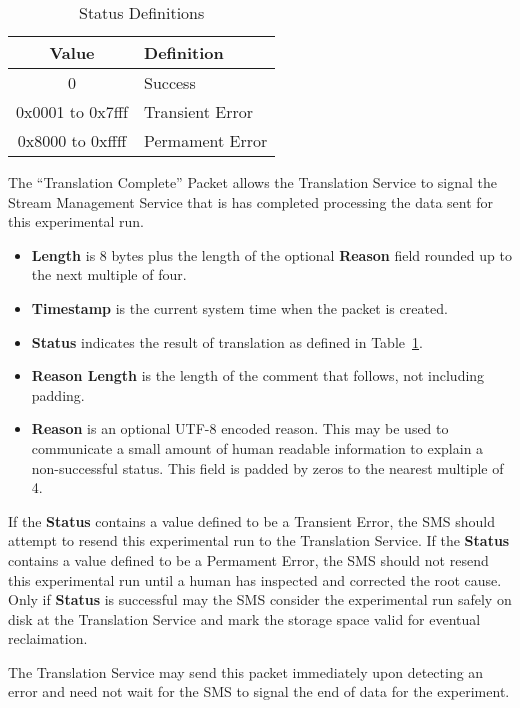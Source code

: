 \begin{table}[h]
  \begin{center}
    \begin{tabular}{c | l}
	Value & Definition \\
	\hline
	0 & Success \\
	0x0001 to 0x7fff & Transient Error \\
	0x8000 to 0xffff & Permament Error \\
    \end{tabular}
  \end{center}
  \caption {Status Definitions}
  \label{table:protocol_completion_status_values}
\end{table}

The ``Translation Complete'' Packet allows the Translation Service to signal
the Stream Management Service that is has completed processing the data sent
for this experimental run.

\begin{itemize}
\item{\bf Length} is 8 bytes plus the length of the optional {\bf Reason} field
rounded up to the next multiple of four.
\item{\bf Timestamp} is the current system time when the packet is created.
\item{\bf Status} indicates the result of translation as defined in
Table~\ref{table:protocol_completion_status_values}.
\item{\bf Reason Length} is the length of the comment that follows, not
including padding.
\item{\bf Reason} is an optional UTF-8 encoded reason. This may be used
to communicate a small amount of human readable information to explain
a non-successful status. This field is padded by zeros to the nearest
multiple of 4.
\end{itemize}

If the {\bf Status} contains a value defined to be a Transient Error, the SMS
should attempt to resend this experimental run to the Translation Service.  If
the {\bf Status} contains a value defined to be a Permament Error, the SMS
should not resend this experimental run until a human has inspected and
corrected the root cause. Only if {\bf Status} is successful may the SMS
consider the experimental run safely on disk at the Translation Service and
mark the storage space valid for eventual reclaimation.

The Translation Service may send this packet immediately upon detecting an
error and need not wait for the SMS to signal the end of data for the
experiment.


